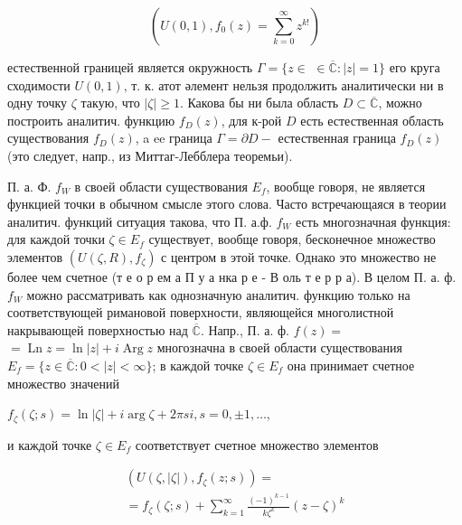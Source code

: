\documentclass[10pt]{article}
\begin{document}
\[

\left(U(0,1), f_{0}(z)=\sum_{k=0}^{\infty} z^{k !}\right)

\]



естественной границей является окружность $\Gamma=\{z \in$ $\in \overline{\mathbb{C}}:|z|=1\}$ его круга сходимости $U(0,1)$, т. к. атот әлемент нельзя продолжить аналитически ни в одну точку $\zeta$ такую, что $|\zeta| \geqslant 1$. Какова бы ни была область $D \subset \overline{\mathbb{C}}$, можно построить аналитич. функцию $f_{D}(z)$, для к-рой $D$ есть естественная область существования $f_{D}(z)$, a ee граница $\Gamma=\partial D-$ естественная граница $f_{D}(z)$ (это следует, напр., из Миттаг-Лебблера теоремьи).



П. а. Ф. $f_{W}$ в своей области существования $E_{f}$, вообще говоря, не является функцией точки в обычном смысле этого слова. Часто встречающаяся в теории аналитич. функций ситуация такова, что П. а.ф. $f_{W}$ есть многозначная функция: для каждой точки $\zeta \in E_{f}$ существует, вообще говоря, бесконечное множество элементов $\left(U(\zeta, R), f_{\zeta}\right)$ с центром в этой точке. Однако это множество не более чем счетное (т е о р ем а П у а нка р е - В оль т е р р а). В целом П. а. ф. $f_{W}$ можно рассматривать как однозначную аналитич. функцию только на соответствующей римановой поверхности, являющейся многолистной накрывающей поверхностью над $\overline{\mathbb{C}}$. Напр., П. а. ф. $f(z)=$ $=\operatorname{Ln} z=\ln |z|+i \operatorname{Arg} z$ многозначна в своей области существования $E_{f}=\{z \in \overline{\mathbb{C}}: 0<|z|<\infty\}$; в каждой точке $\zeta \in E_{f}$ она принимает счетное множество значений



$f_{\zeta}(\zeta ; s)=\ln |\zeta|+i \arg \zeta+2 \pi s i, s=0, \pm 1, \ldots$,



и каждой точке $\zeta \in E_{f}$ соответствует счетное множество элементов



\[

\begin{gathered}

\left(U(\zeta,|\zeta|), f_{\zeta}(z ; s)\right)= \\

=f_{\zeta}(\zeta ; s)+\sum_{k=1}^{\infty} \frac{(-1)^{k-1}}{k \zeta^{k}}(z-\zeta)^{k}

\end{gathered}

\]
\end{document}
